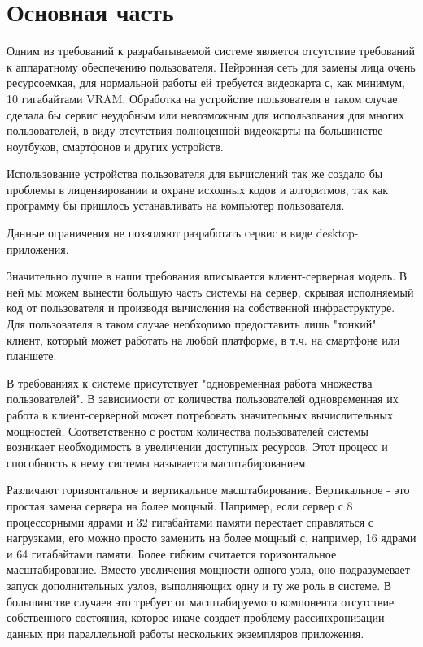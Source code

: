 \section{Основная часть}

Одним из требований к разрабатываемой системе является отсутствие требований к аппаратному обеспечению пользователя. Нейронная сеть для замены лица очень ресурсоемкая, для нормальной работы ей требуется видеокарта с, как минимум, 10 гигабайтами VRAM. Обработка на устройстве пользователя в таком случае сделала бы сервис неудобным или невозможным для использования для многих пользователей, в виду отсутствия полноценной видеокарты на большинстве ноутбуков, смартфонов и других устройств.

Использование устройства пользователя для вычислений так же создало бы проблемы в лицензировании и охране исходных кодов и алгоритмов, так как программу бы пришлось устанавливать на компьютер пользователя.

Данные ограничения не позволяют разработать сервис в виде desktop-приложения.

Значительно лучше в наши требования вписывается клиент-серверная модель. В ней мы можем вынести большую часть системы на сервер, скрывая исполняемый код от пользователя и производя вычисления на собственной инфраструктуре. Для пользователя в таком случае необходимо предоставить лишь "тонкий" клиент, который может работать на любой платформе, в т.ч. на смартфоне или планшете.

В требованиях к системе присутствует "одновременная работа множества пользователей". В зависимости от количества пользователей одновременная их работа в клиент-серверной может потребовать значительных вычислительных мощностей. Соответственно с ростом количества пользователей системы возникает необходимость в увеличении доступных ресурсов. Этот процесс и способность к нему системы называется масштабированием.

Различают горизонтальное и вертикальное масштабирование.
Вертикальное - это простая замена сервера на более мощный. Например, если сервер с 8 процессорными ядрами и 32 гигабайтами памяти перестает справляться с нагрузками, его можно просто заменить на более мощный с, например, 16 ядрами и 64 гигабайтами памяти.
Более гибким считается горизонтальное масштабирование. Вместо увеличения мощности одного узла, оно подразумевает запуск дополнительных узлов, выполняющих одну и ту же роль в системе. В большинстве случаев это требует от масштабируемого компонента отсутствие собственного состояния, которое иначе создает проблему рассинхронизации данных при параллельной работы нескольких экземпляров приложения.

